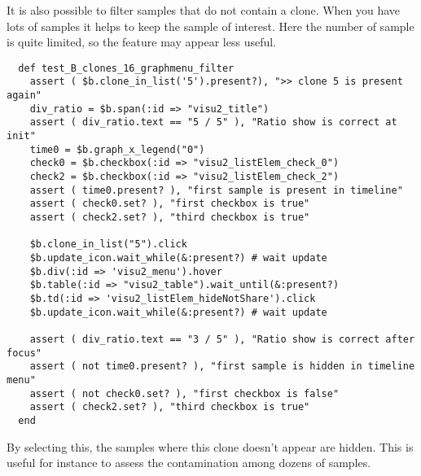 
It is also possible to filter samples that do not contain a clone.  When you
have lots of samples it helps to keep the sample of interest.  Here the number
of sample is quite limited, so the feature may appear less useful.

\begin{verbatim}
  def test_B_clones_16_graphmenu_filter
    assert ( $b.clone_in_list('5').present?), ">> clone 5 is present again"
    div_ratio = $b.span(:id => "visu2_title")
    assert ( div_ratio.text == "5 / 5" ), "Ratio show is correct at init"
    time0 = $b.graph_x_legend("0")
    check0 = $b.checkbox(:id => "visu2_listElem_check_0")
    check2 = $b.checkbox(:id => "visu2_listElem_check_2")
    assert ( time0.present? ), "first sample is present in timeline"
    assert ( check0.set? ), "first checkbox is true"
    assert ( check2.set? ), "third checkbox is true"

    $b.clone_in_list("5").click
    $b.update_icon.wait_while(&:present?) # wait update
    $b.div(:id => 'visu2_menu').hover
    $b.table(:id => "visu2_table").wait_until(&:present?)
    $b.td(:id => 'visu2_listElem_hideNotShare').click
    $b.update_icon.wait_while(&:present?) # wait update

    assert ( div_ratio.text == "3 / 5" ), "Ratio show is correct after focus"
    assert ( not time0.present? ), "first sample is hidden in timeline menu"
    assert ( not check0.set? ), "first checkbox is false"
    assert ( check2.set? ), "third checkbox is true"
  end
\end{verbatim}

By selecting this, the samples where this clone doesn't appear are hidden.
This is useful for instance to assess the contamination among dozens of
samples.

